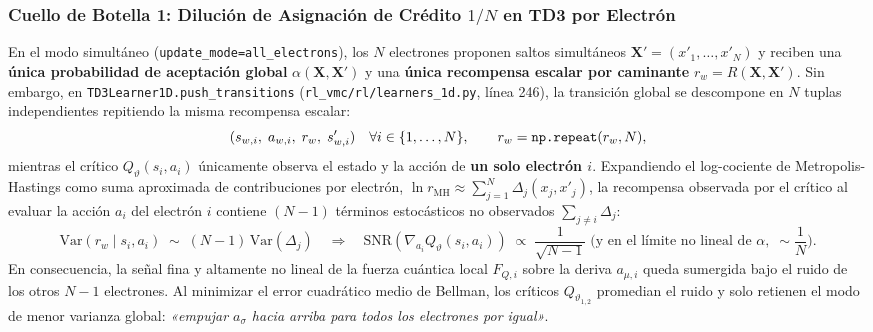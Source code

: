 \documentclass[10pt,a4paper]{article}
\begin{document}
\subsubsection*{Cuello de Botella 1: Dilución de Asignación de Crédito $1/N$ en TD3 por Electrón}
En el modo simultáneo (\texttt{update\_mode=all\_electrons}), los $N$ electrones proponen saltos simultáneos $\bm{X}' = (x'_1, \dots, x'_N)$ y reciben una \textbf{única probabilidad de aceptación global} $\alpha(\bm{X}, \bm{X}')$ y una \textbf{única recompensa escalar por caminante} $r_w = R(\bm{X}, \bm{X}')$. Sin embargo, en \texttt{TD3Learner1D.push\_transitions} (\texttt{rl\_vmc/rl/learners\_1d.py}, línea 246), la transición global se descompone en $N$ tuplas independientes repitiendo la misma recompensa escalar:
\begin{equation}
(s_{w,i},\; a_{w,i},\; r_{w},\; s'_{w,i}) \quad \forall i \in \{1, \dots, N\}, \qquad r_w = \text{\texttt{np.repeat}}(r_w, N),
\end{equation}
mientras el crítico $Q_\vartheta(s_i, a_i)$ únicamente observa el estado y la acción de \textbf{un solo electrón $i$}. Expandiendo el log-cociente de Metropolis-Hastings como suma aproximada de contribuciones por electrón, $\ln r_{\mathrm{MH}} \approx \sum_{j=1}^{N} \Delta_j(x_j, x'_j)$, la recompensa observada por el crítico al evaluar la acción $a_i$ del electrón $i$ contiene $(N-1)$ términos estocásticos no observados $\sum_{j\neq i} \Delta_j$:
\begin{equation}
\mathrm{Var}\!\left(r_w \mid s_i, a_i\right) \;\sim\; (N - 1)\,\mathrm{Var}(\Delta_j) \quad \Longrightarrow \quad \mathrm{SNR}\!\left(\nabla_{a_i} Q_\vartheta(s_i, a_i)\right) \;\propto\; \frac{1}{\sqrt{N-1}} \;\text{(y en el límite no lineal de }\alpha,\; \sim \frac{1}{N}\text{)}.
\label{eq:snr_credit}
\end{equation}
En consecuencia, la señal fina y altamente no lineal de la fuerza cuántica local $F_{Q,i}$ sobre la deriva $a_{\mu,i}$ queda sumergida bajo el ruido de los otros $N-1$ electrones. Al minimizar el error cuadrático medio de Bellman, los críticos $Q_{\vartheta_{1,2}}$ promedian el ruido y solo retienen el modo de menor varianza global: \textit{«empujar $a_\sigma$ hacia arriba para todos los electrones por igual»}.
\end{document}
